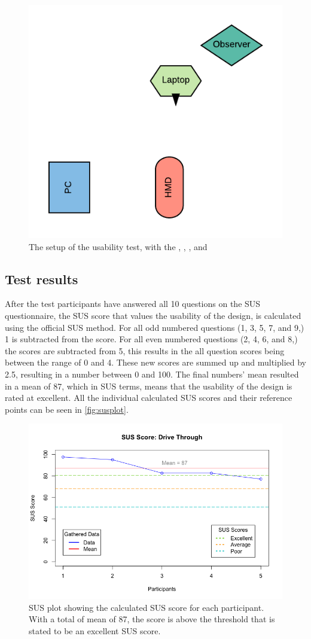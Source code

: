 \begin{figure}[H]
    \centering
    \includegraphics[width=0.6\linewidth]{figure/Design/UsabilitySetup.png}
    \caption{The setup of the usability test, with the \color{red}{HMD/User}, \color{blue}{PC}, \color{teal}{Observer}, and \color{green}{Laptop for SUS}}
    \label{fig:usabilitySetup}
\end{figure}

\subsection{Test results}
After the test participants have answered all 10 questions on the SUS questionnaire, the SUS score that values the usability of the design, is calculated using the official SUS method\cite{SUS}. For all odd numbered questions (1, 3, 5, 7, and 9,) 1 is subtracted from the score. For all even numbered questions (2, 4, 6, and 8,) the scores are subtracted from 5, this results in the all question scores being between the range of 0 and 4. These new scores are summed up and multiplied by 2.5, resulting in a number between 0 and 100\cite{SUS}. The final numbers' mean resulted in a mean of 87, which in SUS terms, means that the usability of the design is rated at excellent\cite{SUS}. All the individual calculated SUS scores and their reference points can be seen in \autoref{fig:susplot}. 

    \begin{figure}[H]
        \centering
        \includegraphics[width=0.8\linewidth]{figure/Design/susplot.png}
        \caption{SUS plot showing the calculated SUS score for each participant. With a total of mean of 87, the score is above the threshold that is stated to be an excellent SUS score.}
        \label{fig:susplot}
    \end{figure}

